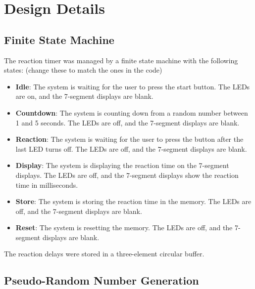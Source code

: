 \documentclass[12pt]{article}
\begin{document}
\newpage

\section{Design Details}


\subsection{Finite State Machine}

The reaction timer was managed by a finite state machine with the following states: (change these to match the ones in the code)
\begin{itemize}
    \item \textbf{Idle}: The system is waiting for the user to press the start button. The LEDs are on, and the 7-segment displays are blank.
    \item \textbf{Countdown}: The system is counting down from a random number between 1 and 5 seconds. The LEDs are off, and the 7-segment displays are blank.
    \item \textbf{Reaction}: The system is waiting for the user to press the button after the last LED turns off. The LEDs are off, and the 7-segment displays are blank.
    \item \textbf{Display}: The system is displaying the reaction time on the 7-segment displays. The LEDs are off, and the 7-segment displays show the reaction time in milliseconds.
    \item \textbf{Store}: The system is storing the reaction time in the memory. The LEDs are off, and the 7-segment displays are blank.
    \item \textbf{Reset}: The system is resetting the memory. The LEDs are off, and the 7-segment displays are blank.
\end{itemize}

The reaction delays were stored in a three-element circular buffer.

\subsection{Pseudo-Random Number Generation}
\end{document}
